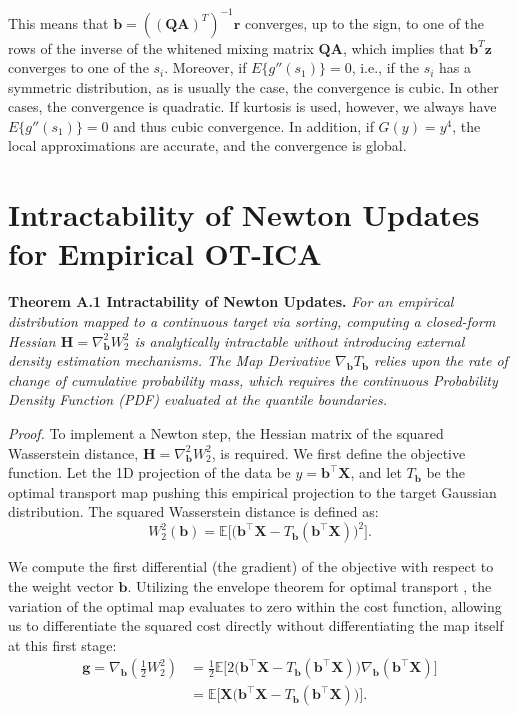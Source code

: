 \documentclass[12pt,a4paper,twoside,openany]{book}
\begin{document}
This means that $\mathbf{b} = ((\mathbf{Q}\mathbf{A})^T)^{-1}\mathbf{r}$ converges, up to the sign, to one of the rows of 
the inverse of the whitened mixing matrix $\mathbf{Q}\mathbf{A}$, which implies that $\mathbf{b}^T\mathbf{z}$ converges to one of the $s_i$. 
Moreover, if $E\{g''(s_1)\} = 0$, i.e., if the $s_i$ has a symmetric distribution, as is usually the case, the convergence is cubic. 
In other cases, the convergence is quadratic. If kurtosis is used, however, we always have $E\{g''(s_1)\} = 0$ and thus cubic convergence. 
In addition, if $G(y) = y^4$, the local approximations are accurate, and the convergence is global.

\section{Intractability of Newton Updates for Empirical OT-ICA}
\label{app:newton_intractable}

\noindent\textbf{Theorem A.1 Intractability of Newton Updates.} \textit{For an empirical distribution mapped to a continuous target via sorting, 
computing a closed-form Hessian $\mathbf{H} = \nabla^2_{\mathbf{b}} W_2^2$ is analytically intractable without introducing external density estimation mechanisms. 
The Map Derivative $\nabla_{\mathbf{b}} T_{\mathbf{b}}$ relies upon the rate of change of cumulative probability mass, 
which requires the continuous Probability Density Function (PDF) evaluated at the quantile boundaries.}
\vspace{0.5em}

\textit{Proof.} To implement a Newton step, the Hessian matrix of the squared Wasserstein distance, $\mathbf{H} = \nabla^2_{\mathbf{b}} W_2^2$, is required. 
We first define the objective function. Let the 1D projection of the data be $y = \mathbf{b}^\top \mathbf{X}$, and let $T_{\mathbf{b}}$ be 
the optimal transport map pushing this empirical projection to the target Gaussian distribution. The squared Wasserstein distance is defined as:
\begin{equation}
    W_2^2(\mathbf{b}) = \mathbb{E}\Big[ \big( \mathbf{b}^\top \mathbf{X} - T_{\mathbf{b}}(\mathbf{b}^\top \mathbf{X}) \big)^2 \Big].
\end{equation}

We compute the first differential (the gradient) of the objective with respect to the weight vector $\mathbf{b}$. 
Utilizing the envelope theorem for optimal transport \cite[Section 7.2]{santambrogio2015optimal}, 
the variation of the optimal map evaluates to zero within the cost function, allowing us to differentiate 
the squared cost directly without differentiating the map itself at this first stage:
\begin{align}
    \mathbf{g} = \nabla_{\mathbf{b}} \left( \frac{1}{2} W_2^2 \right) &= \frac{1}{2} \mathbb{E}\Big[ 2 \big( \mathbf{b}^\top \mathbf{X} - T_{\mathbf{b}}(\mathbf{b}^\top \mathbf{X}) \big) \nabla_{\mathbf{b}} (\mathbf{b}^\top \mathbf{X}) \Big] \nonumber \\
    &= \mathbb{E}\Big[ \mathbf{X} \big( \mathbf{b}^\top \mathbf{X} - T_{\mathbf{b}}(\mathbf{b}^\top \mathbf{X}) \big) \Big].
\end{align}
\end{document}
